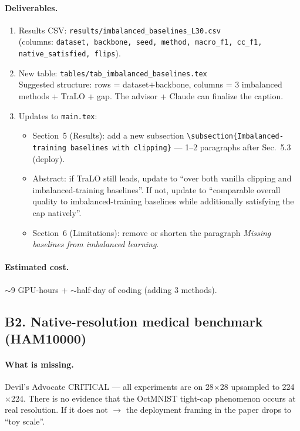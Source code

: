 \documentclass[11pt,a4paper]{article}
\newcommand{\code}[1]{\texttt{#1}}
\newcommand{\file}[1]{\texttt{#1}}
\begin{document}
\paragraph{Deliverables.}
\begin{enumerate}[nosep]
  \item Results CSV: \file{results/imbalanced\_baselines\_L30.csv} \\
        (columns: \code{dataset, backbone, seed, method, macro\_f1, cc\_f1,
        native\_satisfied, flips}).
  \item New table: \file{tables/tab\_imbalanced\_baselines.tex} \\
        Suggested structure: rows = dataset$+$backbone, columns = 3
        imbalanced methods + TraLO + gap. The advisor + Claude can finalize
        the caption.
  \item Updates to \code{main.tex}:
    \begin{itemize}[nosep]
      \item Section~5 (Results): add a new subsection
            \code{\textbackslash{}subsection\{Imbalanced-training baselines
            with clipping\}} --- 1--2 paragraphs after Sec.~5.3 (deploy).
      \item Abstract: if TraLO still leads, update to ``over both vanilla
            clipping and imbalanced-training baselines''. If not, update to
            ``comparable overall quality to imbalanced-training baselines
            while additionally satisfying the cap natively''.
      \item Section~6 (Limitations): remove or shorten the paragraph
            \textit{Missing baselines from imbalanced learning}.
    \end{itemize}
\end{enumerate}

\paragraph{Estimated cost.} $\sim$9 GPU-hours + $\sim$half-day of coding
(adding 3 methods).

\subsection{B2. Native-resolution medical benchmark (HAM10000)}

\paragraph{What is missing.} Devil's Advocate CRITICAL --- all experiments
are on 28$\times$28 upsampled to 224$\times$224. There is no evidence that
the OctMNIST tight-cap phenomenon occurs at real resolution. If it does
not $\to$ the deployment framing in the paper drops to ``toy scale''.
\end{document}
